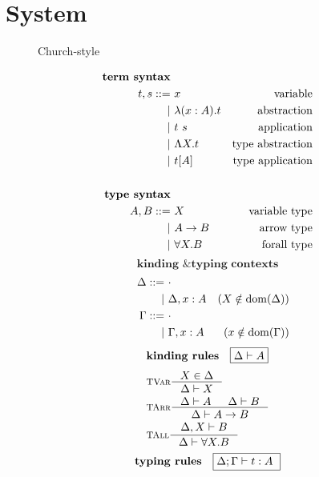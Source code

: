 \section{System \F} \label{sec:f}
\begin{figure}
\begin{singlespace}
\begin{minipage}{.46\textwidth}
	\begin{center}Church-style\end{center}
\def\baselinestretch{0}
\small
\begin{align*}
\textbf{term syntax} \\
t,s ::= &~ x           & \text{variable}    \\
      | &~ \lambda(x:A) . t & \text{abstraction} \\
      | &~ t ~ s       & \text{application} \\
      | &~ \Lambda X    . t & \text{type abstraction} \\
      | &~ t [A]       & \text{type application} \\
\\
\textbf{type syntax} \\
A,B ::= &~ X           & \text{variable type}   \\
      | &~ A -> B      & \text{arrow type} \\
      | &~ \forall X.B & \text{forall type}   \\
\end{align*}
\[ \textbf{kinding \& typing contexts} \]\vspace*{-1em}
\begin{align*}\quad
\Delta ::= &~ \cdot \\
	 | &~ \Delta, x:A & (X\notin \mathop{\mathrm{dom}}(\Delta)) \\
\Gamma ::= &~ \cdot \\
	 | &~ \Gamma, x:A & (x\notin \mathop{\mathrm{dom}}(\Gamma)) \\
\end{align*}
\[ \textbf{kinding rules} \quad \framebox{$ \Delta |- A $} \]\vspace*{-1em}
\begin{align*}
& \inference[\sc TVar]{X \in \Delta}{\Delta |- X} \\
& \inference[\sc TArr]{\Delta |- A & \Delta |- B}{\Delta |- A -> B} \\
& \inference[\sc TAll]{\Delta,X |- B}{\Delta |- \forall X.B} \\
\end{align*}
\[ \textbf{typing rules} \quad \framebox{$ \Delta;\Gamma |- t : A $ } \]

\end{minipage}
\end{singlespace}
\end{figure}
